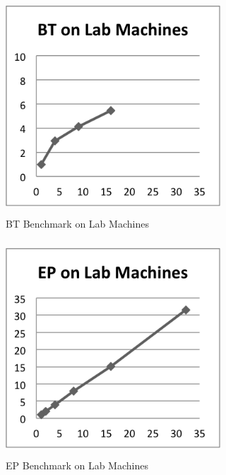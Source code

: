 \documentclass{acm_proc_article-sp}
\begin{document}
\begin{figure}[tbp]
  \centering
  \caption{BT Benchmark on Lab Machines}
	\label{LabBT}
  \includegraphics[width=19pc, height=19pc]{Pics-Lab/BT.png}
\end{figure}

\begin{figure}[tbp]
  \centering
  \caption{EP Benchmark on Lab Machines}
  \label{LabEP}
  \includegraphics[width=19pc, height=19pc]{Pics-Lab/EP.png}
\end{figure}
\end{document}
